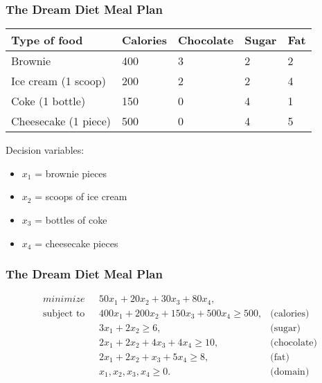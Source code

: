 \documentclass[11pt]{beamer}
\begin{document}
\begin{frame}
\frametitle{The Dream Diet Meal Plan}

\begin{table}
\centering
\begin{tabular}{l|llll}
Type of food & Calories & Chocolate & Sugar  & Fat  \\ 
\hline
\hline
Brownie & 400 & 3 & 2 & 2  \\ 
Ice cream (1 scoop) & 200 & 2 & 2 & 4  \\ 
Coke (1 bottle) & 150 & 0 & 4 & 1  \\ 
Cheesecake (1 piece) & 500 & 0 & 4 & 5  \\
\end{tabular}
\end{table}

Decision variables:
\begin{itemize}
\item $x_1$ = brownie pieces		
\item $x_2$ = scoops of ice cream
\item $x_3$ = bottles of coke	
\item $x_4$ = cheesecake pieces
\end{itemize}
\end{frame}


\begin{frame}
\frametitle{The Dream Diet Meal Plan}
\pause
\begin{align}
\displaystyle minimize \mbox{ } & 50x_1 + 20x_2 + 30 x_3 + 80 x_4, \label{diet:objective} \\
% 
\mbox{subject to }&400 x_1 + 200 x_2 + 150x_3 + 500 x_4 \geq 500, & \mbox{(calories)}  \label{diet:calories}\\
& 3x_1 + 2 x_2  \geq 6, & \mbox{(sugar)}  \label{diet:sugar}\\
& 2x_1 + 2 x_2 + 4x_3 + 4 x_4 \geq 10, & \mbox{(chocolate)}  \label{diet:chocolate}\\
& 2x_1 + 2 x_2 + x_3 + 5x_4 \geq 8, & \mbox{(fat)}  \label{diet:fat}\\
& x_1, x_2, x_3,x_4 \geq 0. & \mbox{(domain)} \label{diet:domain}
\end{align}

\end{frame}
\end{document}

